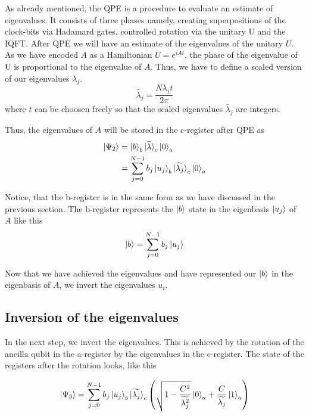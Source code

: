 As already mentioned, the QPE is a procedure to evaluate an estimate of eigenvalues. 
It consists of three phases namely, creating superpositions of the clock-bits via Hadamard gates, controlled rotation via the unitary U and the IQFT.
After QPE we will have an estimate of the eigenvalues of the unitary $U$. 
As we have encoded $A$ as a Hamiltonian $U = e^{iAt}$, the phase of the eigenvalue of U is proportional to the eigenvalue of $A$.
Thus, we have to define a scaled version of our eigenvalues $\lambda_j$.
\begin{equation}
\widetilde{\lambda_j} = \frac {N\lambda_jt}{2\pi}
\end{equation}
where $t$ can be choosen freely so that the scaled eigenvalues $\widetilde{\lambda_j}$ are integers.

Thus, the eigenvalues of $A$ will be stored in the c-register after QPE as
\begin{equation}
\begin{split}
\ket{\Psi_2} &= \ket{b}_b \ket{\widetilde{\lambda}}_c\ket{0}_a \\
& =\sum_{j=0}^{N-1} b_j \ket{u_j}_b \ket{\widetilde{\lambda_j}}_c \ket 0_a
\end{split}
\end{equation}

Notice, that the b-register is in the same form as we have discussed in the previous section. 
The b-register represents the $\ket b$ state in the eigenbasis $\ket{u_j}$ of $A$ like this
\begin{equation}
\ket{b} = \sum_{j=0}^{N-1} b_j\ket{u_j}
\end{equation}

Now that we have achieved the eigenvalues and have represented our $\ket{b}$ in the eigenbasis of $A$, we invert the eigenvalues $u_i$.


\subsection{Inversion of the eigenvalues}
In the next step, we invert the eigenvalues.
This is achieved by the rotation of the ancilla qubit in the a-register by the eigenvalues in the c-register.
The state of the registers after the rotation looks, like this

\begin{equation}
\ket{\Psi_3} = \sum_{j=0}^{N-1} b_j \ket{u_j}_b {\ket{\widetilde{\lambda_j}}}_c \left(\sqrt{1-\frac{C^2}{\widetilde{\lambda_j^2}}}\ket{0}_a + \frac{C}{\widetilde{\lambda_j}} \ket{1}_a\right)
\end{equation}

